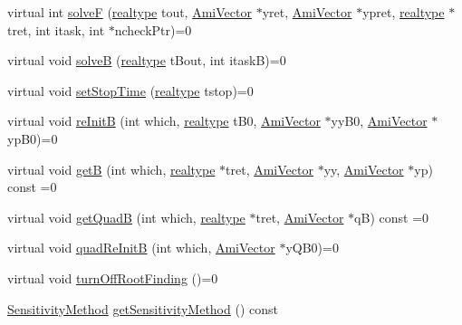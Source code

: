 \begin{DoxyCompactItemize}
virtual int \mbox{\hyperlink{classamici_1_1_solver_aeb16e555b95787057153731984d69ca1}{solveF}} (\mbox{\hyperlink{namespaceamici_a1bdce28051d6a53868f7ccbf5f2c14a3}{realtype}} tout, \mbox{\hyperlink{classamici_1_1_ami_vector}{Ami\+Vector}} $\ast$yret, \mbox{\hyperlink{classamici_1_1_ami_vector}{Ami\+Vector}} $\ast$ypret, \mbox{\hyperlink{namespaceamici_a1bdce28051d6a53868f7ccbf5f2c14a3}{realtype}} $\ast$tret, int itask, int $\ast$ncheck\+Ptr)=0
\item 
virtual void \mbox{\hyperlink{classamici_1_1_solver_ad1e0c0377036b859c20a67e13532e5f0}{solveB}} (\mbox{\hyperlink{namespaceamici_a1bdce28051d6a53868f7ccbf5f2c14a3}{realtype}} t\+Bout, int itaskB)=0
\item 
virtual void \mbox{\hyperlink{classamici_1_1_solver_a5cc7e9730c6ab9490087203b8dd25d55}{set\+Stop\+Time}} (\mbox{\hyperlink{namespaceamici_a1bdce28051d6a53868f7ccbf5f2c14a3}{realtype}} tstop)=0
\item 
virtual void \mbox{\hyperlink{classamici_1_1_solver_ac94e2d6eca13827dbf7771cc8abf144f}{re\+InitB}} (int which, \mbox{\hyperlink{namespaceamici_a1bdce28051d6a53868f7ccbf5f2c14a3}{realtype}} t\+B0, \mbox{\hyperlink{classamici_1_1_ami_vector}{Ami\+Vector}} $\ast$yy\+B0, \mbox{\hyperlink{classamici_1_1_ami_vector}{Ami\+Vector}} $\ast$yp\+B0)=0
\item 
virtual void \mbox{\hyperlink{classamici_1_1_solver_af0e3dc2584bfd8a8b1a1625ac9dad4f4}{getB}} (int which, \mbox{\hyperlink{namespaceamici_a1bdce28051d6a53868f7ccbf5f2c14a3}{realtype}} $\ast$tret, \mbox{\hyperlink{classamici_1_1_ami_vector}{Ami\+Vector}} $\ast$yy, \mbox{\hyperlink{classamici_1_1_ami_vector}{Ami\+Vector}} $\ast$yp) const =0
\item 
virtual void \mbox{\hyperlink{classamici_1_1_solver_a1a4af06dc12f51c43315cba90c4c9181}{get\+QuadB}} (int which, \mbox{\hyperlink{namespaceamici_a1bdce28051d6a53868f7ccbf5f2c14a3}{realtype}} $\ast$tret, \mbox{\hyperlink{classamici_1_1_ami_vector}{Ami\+Vector}} $\ast$qB) const =0
\item 
virtual void \mbox{\hyperlink{classamici_1_1_solver_ae40c916280416567c031c2a14ad957b3}{quad\+Re\+InitB}} (int which, \mbox{\hyperlink{classamici_1_1_ami_vector}{Ami\+Vector}} $\ast$y\+Q\+B0)=0
\item 
virtual void \mbox{\hyperlink{classamici_1_1_solver_acdf98951e1b488e1ca7c099c2b054939}{turn\+Off\+Root\+Finding}} ()=0
\item 
\mbox{\hyperlink{namespaceamici_aa0fa493529f6872e7e776b91fbbf38f9}{Sensitivity\+Method}} \mbox{\hyperlink{classamici_1_1_solver_a888cb7142e103c84bdeeb99566aba65a}{get\+Sensitivity\+Method}} () const

\end{DoxyCompactItemize}
